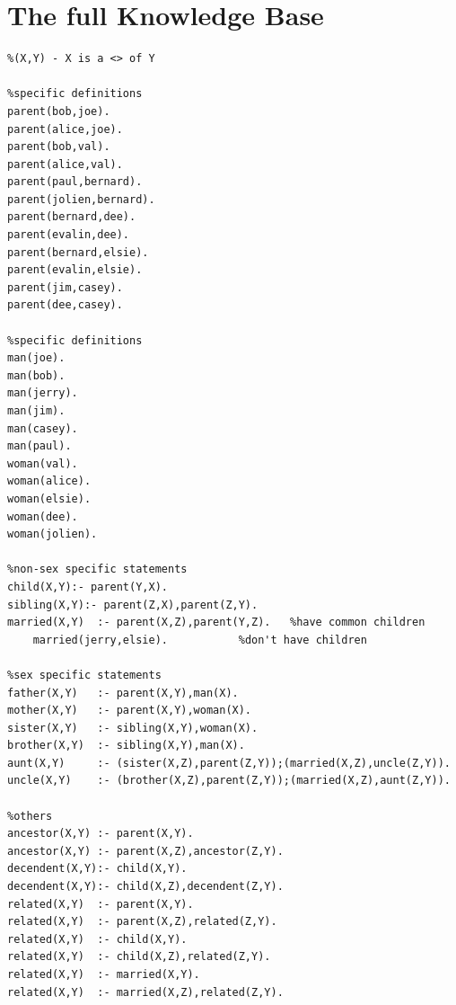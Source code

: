 \documentclass[12pt]{article}
\begin{document}
\pagebreak

\appendix
\appendixpage
\addappheadtotoc

\section{The full Knowledge Base}
\label{sec:appendice a}

 \begin{lstlisting}
%(X,Y) - X is a <> of Y

%specific definitions
parent(bob,joe).
parent(alice,joe).
parent(bob,val).
parent(alice,val).
parent(paul,bernard).
parent(jolien,bernard).
parent(bernard,dee).
parent(evalin,dee).
parent(bernard,elsie).
parent(evalin,elsie).
parent(jim,casey).
parent(dee,casey).

%specific definitions
man(joe).
man(bob).
man(jerry).
man(jim).
man(casey).
man(paul).
woman(val).
woman(alice).
woman(elsie).
woman(dee).
woman(jolien).

%non-sex specific statements
child(X,Y):- parent(Y,X).
sibling(X,Y):- parent(Z,X),parent(Z,Y).
married(X,Y)  :- parent(X,Z),parent(Y,Z). 	%have common children
	married(jerry,elsie). 			%don't have children

%sex specific statements
father(X,Y)   :- parent(X,Y),man(X).
mother(X,Y)   :- parent(X,Y),woman(X).
sister(X,Y)   :- sibling(X,Y),woman(X).
brother(X,Y)  :- sibling(X,Y),man(X).
aunt(X,Y)     :- (sister(X,Z),parent(Z,Y));(married(X,Z),uncle(Z,Y)).
uncle(X,Y)    :- (brother(X,Z),parent(Z,Y));(married(X,Z),aunt(Z,Y)).

%others
ancestor(X,Y) :- parent(X,Y).
ancestor(X,Y) :- parent(X,Z),ancestor(Z,Y).
decendent(X,Y):- child(X,Y).
decendent(X,Y):- child(X,Z),decendent(Z,Y).
related(X,Y)  :- parent(X,Y).
related(X,Y)  :- parent(X,Z),related(Z,Y).
related(X,Y)  :- child(X,Y).
related(X,Y)  :- child(X,Z),related(Z,Y).
related(X,Y)  :- married(X,Y).
related(X,Y)  :- married(X,Z),related(Z,Y).

\end{lstlisting}
\end{document}
